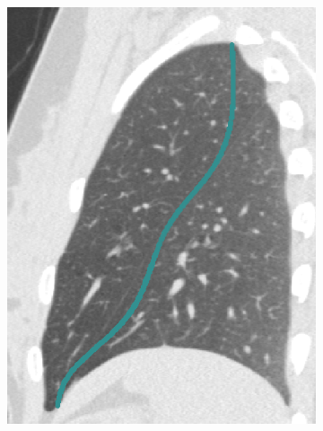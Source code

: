 {\begin{figure}[htbp]
\begin{subfigure}{.35\linewidth}
  \includegraphics[width=\linewidth,trim={{.0\wd0} {.0\wd0} {.0\wd0} {.0\wd0}},clip]{Segmentation/Image/BeforeChangeSearchRegion.png}
  \caption{}
  \label{fig:SearchRegionControl-a} 
\end{subfigure}
\hspace{.3in} %
\begin{subfigure}{.36\linewidth}%

\end{subfigure}
\end{figure}}
